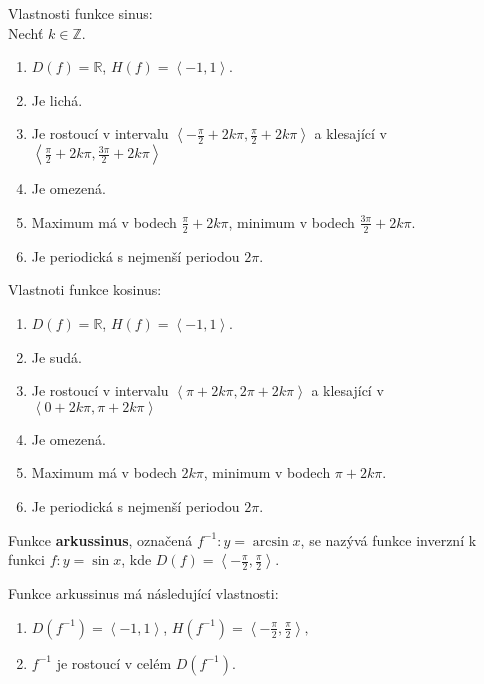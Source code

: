 \begin{veta}
    Vlastnosti funkce sinus:\\
    Nechť $k\in \mathbb Z.$
    \begin{enumerate}[$i.$]
        \item $D(f)= \mathbb R$, $H(f)= \left < -1,1 \right > $.
       	\item Je lichá.
        \item Je rostoucí v intervalu $\left < -\frac{\pi}{2}+2k\pi, \frac{\pi}{2}+2k\pi \right > $
        a klesající v $\left < \frac{\pi}{2}+2k\pi, \frac{3\pi}{2}+2k\pi \right > $
        \item Je omezená.
        \item Maximum má v bodech $\frac{\pi}{2}+2k\pi$, minimum v bodech $\frac{3\pi}{2}+2k\pi.$
        \item Je periodická s nejmenší periodou $2\pi.$
    \end{enumerate}
    Vlastnoti funkce kosinus:
    \begin{enumerate}[$i.$]
        \item $D(f)= \mathbb R$, $H(f)= \left < -1,1 \right > $.
       	\item Je sudá.
        \item Je rostoucí v intervalu $\left < \pi+2k\pi, 2\pi+2k\pi \right > $
        a klesající v $\left < 0+2k\pi, \pi+2k\pi \right > $
        \item Je omezená.
        \item Maximum má v bodech $2k\pi$, minimum v bodech $\pi+2k\pi.$
        \item Je periodická s nejmenší periodou $2\pi.$
    \end{enumerate}
\end{veta}


\begin{definition}[Akrussinus]
Funkce \textbf{arkussinus}, označená $f^{-1}: y=\arcsin x$, se nazývá funkce inverzní
k funkci $f: y=\sin x$, kde $D(f)=\left < -\frac{\pi}{2},\frac{\pi}{2} \right >$.
\end{definition}
\begin{pozn}
    Funkce arkussinus má následující vlastnosti:
    \begin{enumerate}
    \item $D(f^{-1}) = \left < -1, 1 \right >$, $H(f^{-1}) = \left < -\frac{\pi}{2},\frac{\pi}{2} \right >,$
    \item $f^{-1}$ je rostoucí v celém $D(f^{-1}).$
    \end{enumerate}
\end{pozn}


